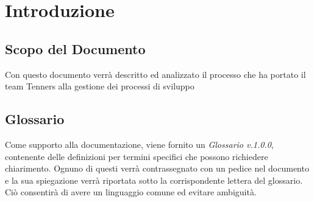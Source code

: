 \section{Introduzione}

\subsection{Scopo del Documento}
Con questo documento verrà descritto ed analizzato il processo che ha portato il team Tenners alla gestione dei processi di sviluppo

\subsection{Glossario}
Come supporto alla documentazione, viene fornito un \textit{Glossario v.1.0.0}, contenente delle definizioni per termini specifici che possono richiedere chiarimento. Ognuno di questi verrà contrassegnato con un pedice \glo nel documento e la sua spiegazione verrà riportata sotto la corrispondente lettera del glossario. Ciò consentirà di avere un linguaggio comune ed evitare ambiguità.

